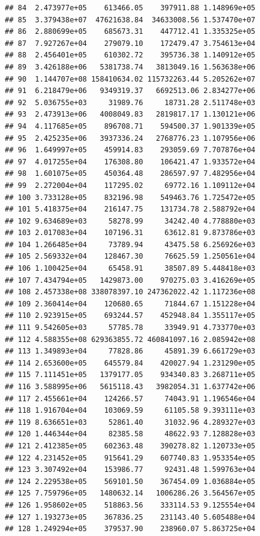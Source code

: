 \documentclass[
]{article}
\begin{document}
\begin{verbatim}
## 84  2.473977e+05    613466.05    397911.88 1.148969e+05
## 85  3.379438e+07  47621638.84  34633008.56 1.537470e+07
## 86  2.880699e+05    685673.31    447712.41 1.335325e+05
## 87  7.927267e+04    279079.10    172479.47 3.754613e+04
## 88  2.456401e+05    610302.72    395736.38 1.140912e+05
## 89  3.426188e+06   5381738.74   3813049.16 1.563638e+06
## 90  1.144707e+08 158410634.02 115732263.44 5.205262e+07
## 91  6.218479e+06   9349319.37   6692513.06 2.834277e+06
## 92  5.036755e+03     31989.76     18731.28 2.511748e+03
## 93  2.473913e+06   4008049.83   2819817.17 1.130121e+06
## 94  4.117685e+05    896708.71    594500.37 1.901339e+05
## 95  2.425235e+06   3937336.24   2768776.23 1.107956e+06
## 96  1.649997e+05    459914.83    293059.69 7.707876e+04
## 97  4.017255e+04    176308.80    106421.47 1.933572e+04
## 98  1.601075e+05    450364.48    286597.97 7.482956e+04
## 99  2.272004e+04    117295.02     69772.16 1.109112e+04
## 100 3.733128e+05    832196.98    549463.76 1.725472e+05
## 101 5.418375e+04    216147.75    131734.78 2.588792e+04
## 102 9.634689e+03     58278.99     34242.40 4.778880e+03
## 103 2.017083e+04    107196.31     63612.81 9.873786e+03
## 104 1.266485e+04     73789.94     43475.58 6.256926e+03
## 105 2.569332e+04    128467.30     76625.59 1.250561e+04
## 106 1.100425e+04     65458.91     38507.89 5.448418e+03
## 107 7.434794e+05   1429873.00    970275.03 3.416269e+05
## 108 2.457338e+08 338078397.10 247362022.42 1.117236e+08
## 109 2.360414e+04    120680.65     71844.67 1.151228e+04
## 110 2.923915e+05    693244.57    452948.84 1.355117e+05
## 111 9.542605e+03     57785.78     33949.91 4.733770e+03
## 112 4.588355e+08 629363855.72 460841097.16 2.085942e+08
## 113 1.349893e+04     77828.86     45891.39 6.661729e+03
## 114 2.653600e+05    645579.84    420027.94 1.231290e+05
## 115 7.111451e+05   1379177.05    934340.83 3.268711e+05
## 116 3.588995e+06   5615118.43   3982054.31 1.637742e+06
## 117 2.455661e+04    124266.57     74043.91 1.196546e+04
## 118 1.916704e+04    103069.59     61105.58 9.393111e+03
## 119 8.636651e+03     52861.40     31032.96 4.289327e+03
## 120 1.446344e+04     82385.58     48622.93 7.128828e+03
## 121 2.412385e+05    602363.48    390278.82 1.120733e+05
## 122 4.231452e+05    915641.29    607740.83 1.953354e+05
## 123 3.307492e+04    153986.77     92431.48 1.599763e+04
## 124 2.229538e+05    569101.50    367454.09 1.036884e+05
## 125 7.759796e+05   1480632.14   1006286.26 3.564567e+05
## 126 1.958602e+05    518863.56    333114.53 9.125554e+04
## 127 1.193273e+05    367836.25    231143.40 5.605488e+04
## 128 1.249294e+05    379537.90    238960.07 5.863725e+04

\end{verbatim}
\end{document}
